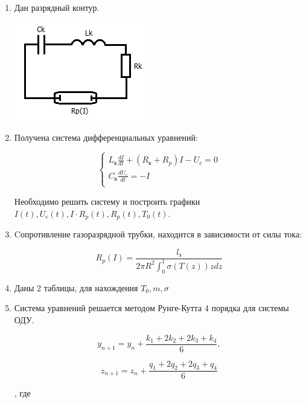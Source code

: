 \documentclass[a4paper,14pt]{extreport} %
\begin{document}
\begin{enumerate}

\item Дан разрядный контур.

\includegraphics[scale=1]{scheme.png}

\item Получена система дифференциальных уравнений:

\begin{equation*}
    \begin{cases}
        L_\text{к}\frac{dI}{dt} + (R_\text{к} + R_p) I - U_c = 0 \\
        C_\text{к} \frac{dU_c}{dt} = -I \\
    \end{cases}
\end{equation*}

Необходимо решить систему и построить графики $I(t), U_c(t), I\cdot R_p(t), R_p(t), T_0(t)$. 

\item Cопротивление газоразрядной трубки, находится в зависимости от силы тока:

\begin{equation*}
    R_p(I) = \frac{l_{\text{э}}}{2 \pi R^2 \int_0^1 \sigma(T(z))zdz}
\end{equation*}

\item Даны 2 таблицы, для нахождения $T_0, m, \sigma$

\item Система уравнений решается методом Рунге-Кутта 4 порядка для системы ОДУ. 

\begin{equation*}
    y_{n+1} = y_n + \frac{k_1 + 2k_2 + 2k_3 + k_4}{6},
\end{equation*}

\begin{equation*}
    z_{n+1} = z_n + \frac{q_1 + 2q_2 + 2q_3 + q_4}{6}
\end{equation*}

, где


\end{enumerate}
\end{document}
